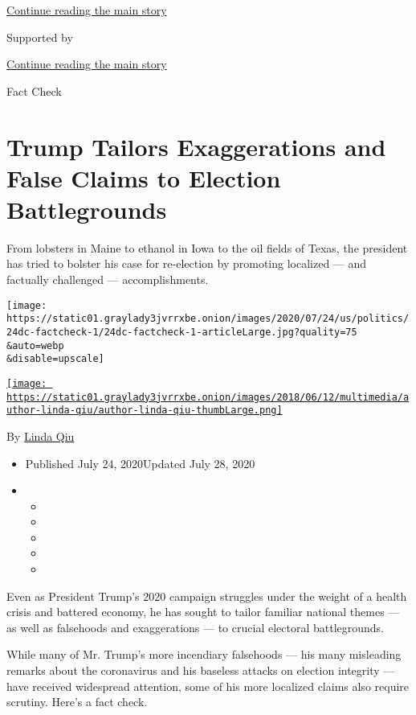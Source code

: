 \protect\hyperlink{after-top}{Continue reading the main story}

Supported by

\protect\hyperlink{after-sponsor}{Continue reading the main story}

Fact Check

\hypertarget{trump-tailors-exaggerations-and-false-claims-to-election-battlegrounds}{%
\section{Trump Tailors Exaggerations and False Claims to Election
Battlegrounds}\label{trump-tailors-exaggerations-and-false-claims-to-election-battlegrounds}}

From lobsters in Maine to ethanol in Iowa to the oil fields of Texas,
the president has tried to bolster his case for re-election by promoting
localized --- and factually challenged --- accomplishments.

\texttt{[image: https://static01.graylady3jvrrxbe.onion/images/2020/07/24/us/politics/24dc-factcheck-1/24dc-factcheck-1-articleLarge.jpg?quality=75\\\&auto=webp\\\&disable=upscale]}

\href{https://www.nytimes3xbfgragh.onion/by/linda-qiu}{\texttt{[image: https://static01.graylady3jvrrxbe.onion/images/2018/06/12/multimedia/author-linda-qiu/author-linda-qiu-thumbLarge.png]}}

By \href{https://www.nytimes3xbfgragh.onion/by/linda-qiu}{Linda Qiu}

\begin{itemize}
\item
  Published July 24, 2020Updated July 28, 2020
\item
  \begin{itemize}
  \item
  \item
  \item
  \item
  \item
  \end{itemize}
\end{itemize}

Even as President Trump's 2020 campaign struggles under the weight of a
health crisis and battered economy, he has sought to tailor familiar
national themes --- as well as falsehoods and exaggerations --- to
crucial electoral battlegrounds.

While many of Mr. Trump's more incendiary falsehoods --- his many
misleading remarks about the coronavirus and his baseless attacks on
election integrity --- have received widespread attention, some of his
more localized claims also require scrutiny. Here's a fact check.

